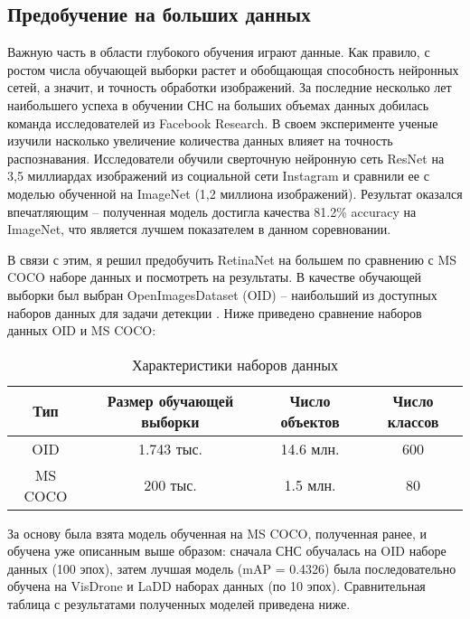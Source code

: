 \subsection{Предобучение на больших данных} \label{sect-6-2}

Важную часть в области глубокого обучения играют данные. Как правило, с ростом числа обучающей выборки растет и обобщающая способность нейронных сетей, а значит, и точность обработки изображений. За последние несколько лет наибольшего успеха в обучении СНС на больших объемах данных добилась команда исследователей из Facebook Research. В своем эксперименте \cite{lib-insta-net} ученые изучили насколько увеличение количества данных влияет на точность распознавания. Исследователи обучили сверточную нейронную сеть ResNet на 3,5 миллиардах изображений из социальной сети Instagram и сравнили ее с моделью обученной на ImageNet (1,2 миллиона изображений). Результат оказался впечатляющим -- полученная модель достигла качества 81.2\% accuracy на ImageNet, что является лучшем показателем в данном соревновании. 


В связи с этим, я решил предобучить RetinaNet на большем по сравнению с MS COCO наборе данных и посмотреть на результаты. В качестве обучающей выборки был выбран OpenImagesDataset (OID) -- наибольший из доступных наборов данных для задачи детекции \cite{lib-iod}. Ниже приведено сравнение наборов данных OID и MS COCO:

\begin{table}[H]
    \caption{Характеристики наборов данных}\label{datasets}
    \begin{tabular}{|c|c|c|c|}
        \hline
        {Тип} & {Размер обучающей выборки} & {Число объектов} & {Число классов} \\
        \hline
        OID & 1.743 тыс. & 14.6 млн. & 600 \\
        \hline
        MS COCO & 200 тыс. & 1.5 млн. & 80 \\
        \hline
    \end{tabular}
\end{table}

За основу была взята модель обученная на MS COCO, полученная ранее, и обучена уже описанным выше образом: сначала СНС обучалась на OID наборе данных (100 эпох), затем лучшая модель (mAP = 0.4326) была последовательно обучена на VisDrone и LaDD наборах данных (по 10 эпох). Сравнительная таблица с результатами полученных моделей приведена ниже.

